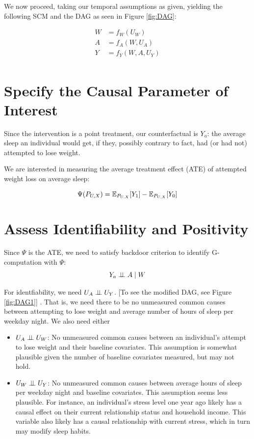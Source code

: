 \documentclass{article}
\begin{document}
We now proceed, taking our temporal assumptions as given, yielding the following SCM and the DAG as seen in Figure \ref{fig:DAG}:

\begin{align*}
W &= f_{W}(U_{W}) \\
A &= f_{A}(W,U_{A}) \\
Y &= f_{Y}(W,A,U_{Y}) \\
\end{align*}


\section{Specify the Causal Parameter of Interest}

Since the intervention is a point treatment, our counterfactual is $Y_{a}$: the average sleep an individual would get, if they, possibly contrary to fact, had (or had not) attempted to lose weight.

We are interested in measuring the average treatment effect (ATE) of attempted weight loss on average sleep:

$$\Psi(P_{U,X}) = \mathbb{E}_{P_{U,X}}[Y_1] - \mathbb{E}_{P_{U,X}}[Y_0]$$

\section{Assess Identifiability and Positivity}
\label{sec:assumptions}

Since $\Psi$ is the ATE, we need to satisfy backdoor criterion to identify G-computation with $\Psi$:
   $$Y_{a} \perp\hspace{-5pt}\perp A \mid W$$

For identfiability, we need $U_{A} \perp\hspace{-5pt}\perp U_{Y}$. [To see the modified DAG, see Figure \ref{fig:DAG1}] .  That is, we need there to be no unmeasured common causes between attempting to lose weight and average number of hours of sleep per weekday night. We also need either 
    \begin{itemize}
      \item $U_{A} \perp\hspace{-5pt}\perp U_{W}$: No unmeasured common causes between an individual's attempt to lose weight and their baseline covariates. This assumption is somewhat plausible given the number of baseline covariates measured, but may not hold.
      \item $U_{W} \perp\hspace{-5pt}\perp U_{Y}$: No unmeasured common causes between average hours of sleep per weekday night and baseline covariates. This assumption seems less plausible. For instance, an individual's stress level one year ago likely has a causal effect on their current relationship status and household income. This variable also likely has a causal relationship with current stress, which in turn may modify sleep habits.
    \end{itemize}
\end{document}
